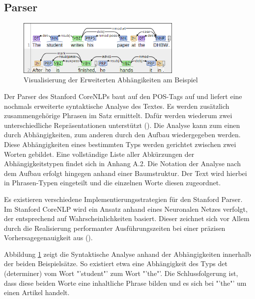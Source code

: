 \subsection{Parser}
\label{subsec:parser}
\begin{figure}
\includegraphics[width=8cm]{pictures/Parser.png}
\caption{Visualisierung der Erweiterten Abhängikeiten am Beispiel}
\label{fig:ENHDEPS}
\end{figure}
Der Parser des Stanford CoreNLPs baut auf den POS-Tags auf und liefert eine nochmals erweiterte syntaktische Analyse des Textes. Es werden zusätzlich zusammengehörige Phrasen im Satz ermittelt. Dafür werden wiederum zwei unterschiedliche Repräsentationen unterstützt (\cite[vgl.][4]{STANFORDNLP}). Die Analyse kann zum einen durch Abhängigkeiten, zum anderen durch den Aufbau wiedergegeben werden. Diese Abhängigkeiten eines bestimmten Typs werden gerichtet zwischen zwei Worten gebildet. Eine vollständige Liste aller Abkürzungen der Abhängigkeitstypen findet sich in Anhang A.2. Die Notation der Analyse nach dem Aufbau erfolgt hingegen anhand einer Baumstruktur. Der Text wird hierbei in Phrasen-Typen eingeteilt und die einzelnen Worte diesen zugeordnet.\par Es existieren verschiedene Implementierungsstrategien für den Stanford Parser. Im Stanford CoreNLP wird ein Ansatz anhand eines Neuronalen Netzes verfolgt, der entsprechend auf Wahrscheinlichkeiten basiert. Dieser zeichnet sich vor Allem durch die Realisierung performanter Ausführungszeiten bei einer präzisen Vorhersagegenauigkeit aus (\cite[vgl.][8]{DEPPARSER}).\par
Abbildung \ref{fig:ENHDEPS} zeigt die Syntaktische Analyse anhand der Abhängigkeiten innerhalb der beiden Beispielsätze. So existiert etwa eine Abhängigkeit des Typs det (determiner) vom Wort "'student"' zum Wort "'the"'. Die Schlussfolgerung ist, dass diese beiden Worte eine inhaltliche Phrase bilden und es sich bei "'the"' um einen Artikel handelt.

